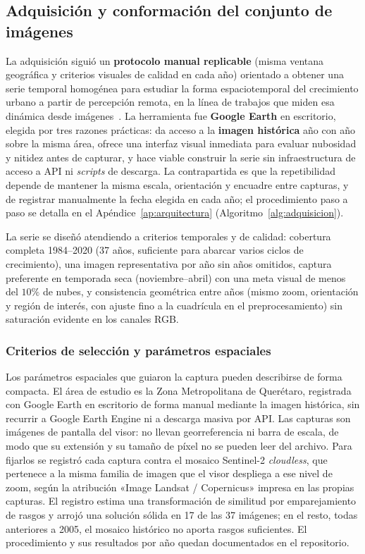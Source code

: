 \subsection{Adquisición y conformación del conjunto de imágenes}

La adquisición siguió un \textbf{protocolo manual replicable} (misma ventana geográfica y criterios visuales de calidad en cada año) orientado a obtener una serie temporal homogénea para estudiar la forma espaciotemporal del crecimiento urbano a partir de percepción remota, en la línea de trabajos que miden esa dinámica desde imágenes~\parencite{Herold2003}. La herramienta fue \textbf{Google Earth} en escritorio, elegida por tres razones prácticas: da acceso a la \textbf{imagen histórica} año con año sobre la misma área, ofrece una interfaz visual inmediata para evaluar nubosidad y nitidez antes de capturar, y hace viable construir la serie sin infraestructura de acceso a API ni \textit{scripts} de descarga. La contrapartida es que la repetibilidad depende de mantener la misma escala, orientación y encuadre entre capturas, y de registrar manualmente la fecha elegida en cada año; el procedimiento paso a paso se detalla en el Apéndice~\ref{ap:arquitectura} (Algoritmo~\ref{alg:adquisicion}).

La serie se diseñó atendiendo a criterios temporales y de calidad: cobertura completa 1984--2020 (37 años, suficiente para abarcar varios ciclos de crecimiento), una imagen representativa por año sin años omitidos, captura preferente en temporada seca (noviembre--abril) con una meta visual de menos del $10\%$ de nubes, y consistencia geométrica entre años (mismo zoom, orientación y región de interés, con ajuste fino a la cuadrícula en el preprocesamiento) sin saturación evidente en los canales RGB.

\subsubsection{Criterios de selección y parámetros espaciales}

Los parámetros espaciales que guiaron la captura pueden describirse de forma compacta. El área de estudio es la Zona Metropolitana de Querétaro, registrada con Google Earth en escritorio de forma manual mediante la imagen histórica, sin recurrir a Google Earth Engine ni a descarga masiva por API. Las capturas son imágenes de pantalla del visor: no llevan georreferencia ni barra de escala, de modo que su extensión y su tamaño de píxel no se pueden leer del archivo. Para fijarlos se registró cada captura contra el mosaico Sentinel-2 \textit{cloudless}, que pertenece a la misma familia de imagen que el visor despliega a ese nivel de zoom, según la atribución «Image Landsat / Copernicus» impresa en las propias capturas. El registro estima una transformación de similitud por emparejamiento de rasgos y arrojó una solución sólida en 17 de las 37 imágenes; en el resto, todas anteriores a 2005, el mosaico histórico no aporta rasgos suficientes. El procedimiento y sus resultados por año quedan documentados en el repositorio.

